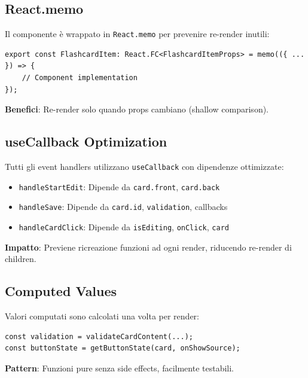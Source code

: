 \documentclass[11pt,a4paper]{article}
\begin{document}
\subsection{React.memo}

Il componente è wrappato in \texttt{React.memo} per prevenire re-render inutili:

\begin{lstlisting}[style=typescript, caption=Memoization]
export const FlashcardItem: React.FC<FlashcardItemProps> = memo(({ ... }) => {
    // Component implementation
});
\end{lstlisting}

\textbf{Benefici}: Re-render solo quando props cambiano (shallow comparison).

\subsection{useCallback Optimization}

Tutti gli event handlers utilizzano \texttt{useCallback} con dipendenze ottimizzate:

\begin{itemize}
    \item \texttt{handleStartEdit}: Dipende da \texttt{card.front}, \texttt{card.back}
    \item \texttt{handleSave}: Dipende da \texttt{card.id}, \texttt{validation}, callbacks
    \item \texttt{handleCardClick}: Dipende da \texttt{isEditing}, \texttt{onClick}, \texttt{card}
\end{itemize}

\textbf{Impatto}: Previene ricreazione funzioni ad ogni render, riducendo re-render di children.

\subsection{Computed Values}

Valori computati sono calcolati una volta per render:

\begin{lstlisting}[style=typescript, caption=Computed Values]
const validation = validateCardContent(...);
const buttonState = getButtonState(card, onShowSource);
\end{lstlisting}

\textbf{Pattern}: Funzioni pure senza side effects, facilmente testabili.

\end{document}
